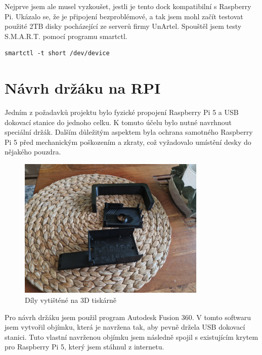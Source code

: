 \documentclass[a4paper,12pt, oneside]{book}
\begin{document}
Nejprve jsem ale musel vyzkoušet, jestli je tento dock kompatibilní 
s Raspberry Pi. Ukázalo se, že je připojení bezproblémové, a tak
jsem mohl začít testovat použité 2TB disky pocházející ze serverů
firmy UnArtel. Spouštěl jsem testy S.M.A.R.T. pomocí programu smartctl.

\begin{lstlisting}
smartctl -t short /dev/device
\end{lstlisting} 




\section{Návrh držáku na RPI}

Jedním z požadavků projektu bylo fyzické propojení Raspberry Pi 5 a USB dokovací
stanice do jednoho celku. K tomuto účelu bylo nutné navrhnout speciální držák.
Dalším důležitým aspektem byla ochrana samotného Raspberry Pi 5 před mechanickým
poškozením a zkraty, což vyžadovalo umístění desky do nějakého pouzdra.

\begin{figure}[h]
\centering
\includegraphics[width=0.8\textwidth]{img/dily-zvlast.jpg}
\caption{Díly vytišténé na 3D tiskárně}
\end{figure}

Pro návrh držáku jsem použil program Autodesk Fusion 360. V tomto softwaru jsem
vytvořil objímku, která je navržena tak, aby pevně držela USB dokovací stanici.
Tuto vlastní navrženou objímku jsem následně spojil s existujícím krytem pro
Raspberry Pi 5, který jsem stáhnul z internetu. 
\end{document}
